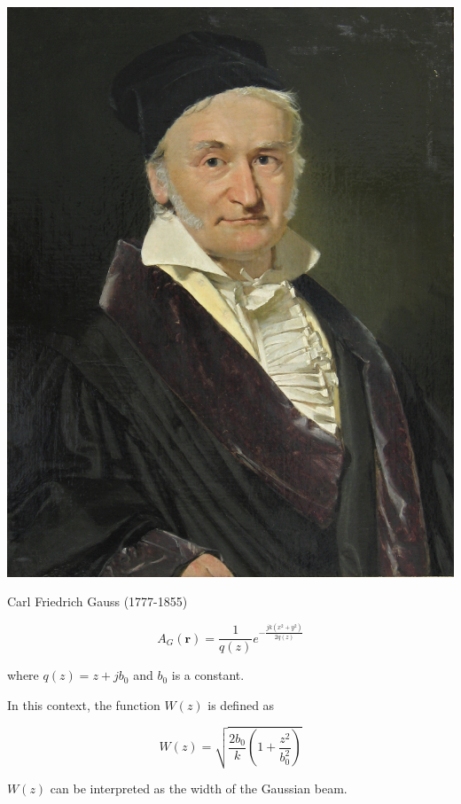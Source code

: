 \begin{marginfigure}[-.7cm]
\includegraphics{hermite/figures/c_gauss}
\caption{Carl Friedrich Gauss (1777-1855)}
\end{marginfigure}

\begin{equation}
A_G({\mathbf r}) = \frac{1}{q(z)}e^{-\frac{jk(x^2 + y^2)}{2q(z)}} \label{eq-gauss}
\end{equation}   

where $q(z)=z+jb_0$ and $b_0$ is a constant. 

In this context, the function $W(z)$ is defined as

\begin{equation}
W(z)=\sqrt{\frac{2 b_0}{k} \left(1 + \frac{z^2}{b_0^2}\right)} \label{eq-W}
\end{equation} 

$W(z)$ can be interpreted as the width of the Gaussian beam.

